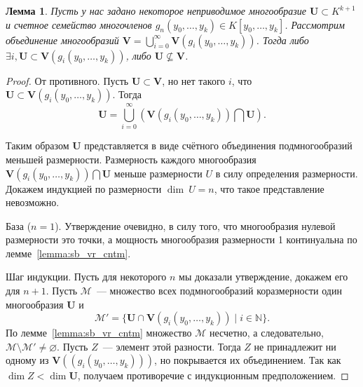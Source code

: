 \documentclass[16pt]{article}
\theoremstyle{plain}
\newtheorem{lemma}[theorem]{Лемма}
\theoremstyle{definition}
\theoremstyle{remark}
\begin{document}
\begin{lemma} \label{lemma:o vlojenii}
Пусть у нас задано некоторое неприводимое многообразие
$\mathbf{U}\subset K^{k+1}$ и счетное семейство многочленов
$g_n(y_0,\ldots, y_k)\in K[y_0,\ldots, y_k ]$. Рассмотрим объединение
многообразий $\mathbf{V}=\bigcup\limits
_{i=0}^{\infty}\mathbf{V}(g_i(y_0,\ldots, y_k))$. Тогда либо
$\exists i, \mathbf{U} \subset \mathbf{V}(g_i(y_0,\ldots, y_k))$, либо
$\mathbf{U}\nsubseteq \mathbf{V}$.
\end{lemma}

\begin{proof}
От противного. Пусть $\mathbf{U}\subset \mathbf{V}$, но нет такого
$i$, что $\mathbf{U} \subset \mathbf{V}(g_i(y_0,\ldots, y_k))$.
Тогда
$$
\mathbf{U}=\bigcup\limits_{i=0}^{\infty}(\mathbf{V}(g_i(y_0,\ldots,
y_k))\bigcap \mathbf{U}).
$$

Таким образом $\mathbf{U}$ представляется в виде счётного объединения
подмногообразий меньшей размерности. Размерность каждого многообразия
$\mathbf{V}(g_i(y_0,\ldots, y_k))\bigcap \mathbf{U}$ меньше
размерности $U$ в силу определения размерности. Докажем индукцией
по размерности $\dim~U=n$,
что такое представление невозможно.

База ($n=1$). Утверждение очевидно, в силу того, что многообразия
нулевой размерности это точки, а мощность многообразия
размерности 1 континуальна по лемме~\ref{lemma:sb_vr_cntm}.

Шаг индукции. Пусть для некоторого $n$ мы доказали утверждение, докажем его для $n+1$.
Пусть $\mathcal M$~--- множество всех подмногообразий коразмерности
один многообразия $\mathbf{U}$ и
$$
\mathcal M' = \{ \mathbf{U}\cap \mathbf{V}(g_i(y_0,\ldots,y_k))\mid
i\in \mathbb N \}.
$$
По лемме~\ref{lemma:sb_vr_cntm} множество $\mathcal M$ несчетно, а
следовательно, $\mathcal M\setminus\mathcal M'\neq \varnothing$.
Пусть $Z$~--- элемент этой разности. Тогда $Z$ не принадлежит ни
одному из $\mathbf{V}((g_i(y_0,\ldots,y_k)))$, но покрывается их
объединением. Так как $\dim Z<\dim \mathbf{U}$, получаем
противоречие с индукционным предположением.
\end{proof}
\end{document}
